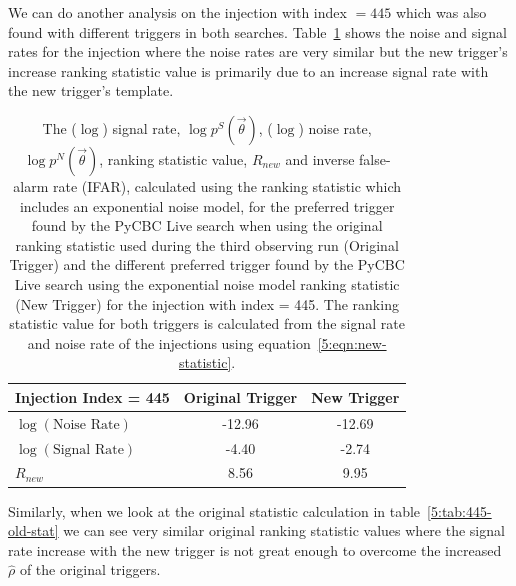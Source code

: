 We can do another analysis on the injection with index $= 445$ which was also found with different triggers in both searches. Table~\ref{5:tab:445-new-stat} shows the noise and signal rates for the injection where the noise rates are very similar but the new trigger's increase ranking statistic value is primarily due to an increase signal rate with the new trigger's template.
%
\begin{table}[ht]
    \centering
    \begin{tabular}{lcc}
        \toprule
        \textbf{Injection Index = 445} & \textbf{Original Trigger} & \textbf{New Trigger} \\
        \midrule
        $\log\left(\text{Noise Rate}\right)$  & -12.96 & -12.69 \\
        $\log\left(\text{Signal Rate}\right)$ & -4.40 & -2.74 \\
        $R_{new}$ & 8.56 & 9.95 \\
        \bottomrule
    \end{tabular}
    \caption{The ($\log$) signal rate, $\log p^{S}(\Vec{\theta})$, ($\log$) noise rate, $\log p^{N}(\Vec{\theta})$, ranking statistic value, $R_{new}$ and inverse false-alarm rate (IFAR), calculated using the ranking statistic which includes an exponential noise model, for the preferred trigger found by the PyCBC Live search when using the original ranking statistic used during the third observing run (Original Trigger) and the different preferred trigger found by the PyCBC Live search using the exponential noise model ranking statistic (New Trigger) for the injection with index = 445. The ranking statistic value for both triggers is calculated from the signal rate and noise rate of the injections using equation~\ref{5:eqn:new-statistic}.}
    \label{5:tab:445-new-stat}
\end{table}
%
Similarly, when we look at the original statistic calculation in table~\ref{5:tab:445-old-stat} we can see very similar original ranking statistic values where the signal rate increase with the new trigger is not great enough to overcome the increased $\hat{\rho}$ of the original triggers.
%
